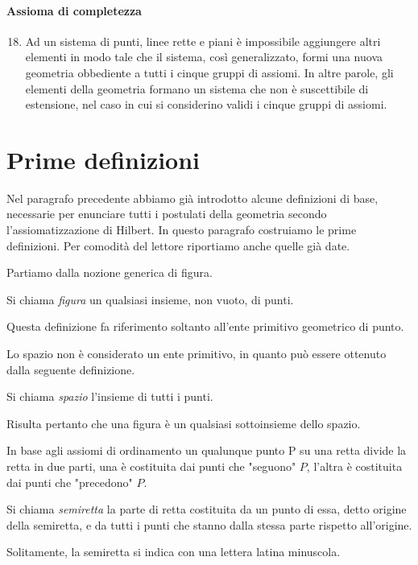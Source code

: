 \paragraph{Assioma di completezza}

\begin{enumerate}[label=\Roman{*}.]
\setcounter{enumi}{17}
\item Ad un sistema di punti, linee rette e piani è impossibile aggiungere altri elementi in modo tale che il sistema, così generalizzato, formi una nuova geometria obbediente a tutti i cinque gruppi di assiomi. In altre parole, gli elementi della geometria formano un sistema che non è suscettibile di estensione, nel caso in cui si considerino validi i cinque gruppi di assiomi.
\end{enumerate}

\section{Prime definizioni}

Nel paragrafo precedente abbiamo già introdotto alcune definizioni di base, necessarie per enunciare tutti i postulati della geometria secondo l'assiomatizzazione di Hilbert. In questo paragrafo costruiamo le prime definizioni. Per comodità del lettore riportiamo anche quelle già date.

Partiamo dalla nozione generica di figura.
\begin{definizione}
Si chiama \emph{figura} un qualsiasi insieme, non vuoto, di punti.
\end{definizione}
Questa definizione fa riferimento soltanto all'ente primitivo geometrico di punto.

Lo spazio non è considerato un ente primitivo, in quanto può essere ottenuto dalla seguente definizione.
\begin{definizione}
Si chiama \emph{spazio} l'insieme di tutti i punti.
\end{definizione}
Risulta pertanto che una figura è un qualsiasi sottoinsieme dello spazio.

In base agli assiomi di ordinamento un qualunque punto P su una retta divide la retta in due parti, una è costituita dai punti che "seguono" $ P $, l'altra è costituita dai punti che "precedono" $ P $.
\begin{definizione}
Si chiama \emph{semiretta} la parte di retta costituita da un punto di essa, detto origine della semiretta, e da tutti i punti che stanno dalla stessa parte rispetto all'origine.
\end{definizione}
Solitamente, la semiretta si indica con una lettera latina minuscola.

